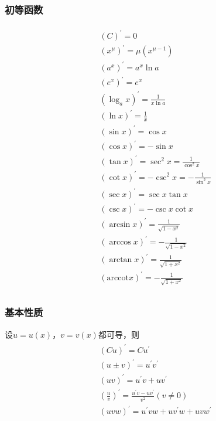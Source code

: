 \documentclass[12pt]{book}
\begin{document}
\subsubsection{初等函数}
\begin{gather*}
    \begin{aligned} 
        & (C)^\prime=0 \\
        & (x^\mu)^\prime = \mu (x^{\mu-1}) \\
        & (a^x)^\prime = a^x \ln{a} \\
        & (e^x)^\prime=e^x  \\
        & (\log_{a}{x})^\prime=\frac{1}{x\ln{a}} \\
        & (\ln{x})^\prime=\frac{1}{x}  \\ 
        & (\sin{x})^\prime=\cos{x} \\ 
        & (\cos{x})^\prime=-\sin{x}  \\
        & (\tan{x})^\prime=\sec^2{x}=\frac{1}{\cos^2{x}}  \\
        & (\cot{x})^\prime=-\csc^2{x}=-\frac{1}{\sin^2{x}}  \\
        & (\sec{x})^\prime=\sec{x}\tan{x} \\
        & (\csc{x})^\prime=-\csc{x}\cot{x}  \\
        & (\arcsin{x})^\prime=\frac{1}{\sqrt{1-x^2}} \\
        & (\arccos{x})^\prime=-\frac{1}{\sqrt{1-x^2}}  \\
        & (\arctan{x})^\prime=\frac{1}{\sqrt{1+x^2}} \\
        & (\mathrm{arccot}{x})^\prime=-\frac{1}{\sqrt{1+x^2}}   \\ 
        \end{aligned}    
\end{gather*}
 

\subsubsection{基本性质}

设$u=u(x) $，$v=v(x)$都可导，则
\begin{gather*}
    \begin{aligned}
        & (Cu)^\prime=Cu^\prime \\
        & (u\pm v)^\prime=u^\prime v^\prime \\
        & (uv)^\prime=u^\prime v+uv^\prime \\
        & \left(\frac{u}{v}\right)^\prime=\frac{u^\prime v-uv^\prime}{v^2} (v\ne 0)\\
        & (uvw)^\prime =u^\prime vw+uv^\prime w+uvw^\prime
    \end{aligned} 
\end{gather*}
\end{document}
